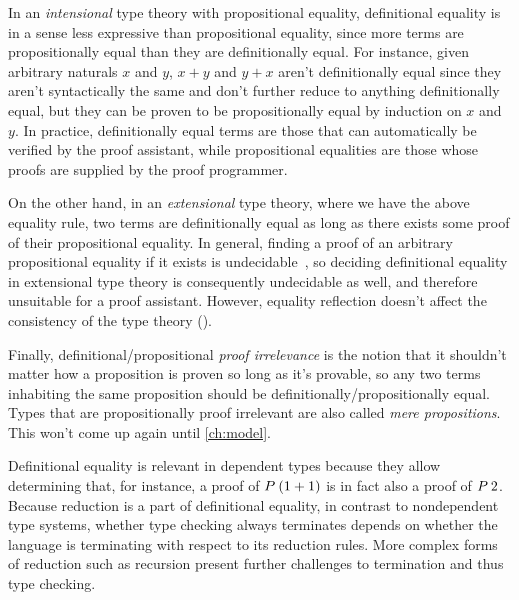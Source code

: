 In an \emph{intensional} type theory with propositional equality,
definitional equality is in a sense less expressive than propositional equality,
since more terms are propositionally equal than they are definitionally equal.
For instance, given arbitrary naturals $x$ and $y$,
$x + y$ and $y + x$ aren't definitionally equal since they aren't syntactically the same
and don't further reduce to anything definitionally equal,
but they can be proven to be propositionally equal by induction on $x$ and $y$.
In practice, definitionally equal terms are those that can automatically be verified by the proof assistant,
while propositional equalities are those whose proofs are supplied by the proof programmer.
%
%
On the other hand, in an \emph{extensional} type theory, where we have the above equality  rule,
two terms are definitionally equal as long as there exists some proof of their propositional equality.
In general, finding a proof of an arbitrary propositional equality if it exists is undecidable~\citep{extensional-concepts},
so deciding definitional equality in extensional type theory is consequently undecidable as well,
and therefore unsuitable for a proof assistant.
However, equality reflection doesn't affect the consistency of the type theory (\cf \opcit).

Finally, definitional/propositional \emph{proof irrelevance}
is the notion that it shouldn't matter how a proposition is proven so long as it's provable,
so any two terms inhabiting the same proposition should be definitionally/propositionally equal.
Types that are propositionally proof irrelevant are also called \emph{mere propositions}.
This won't come up again until \cref{ch:model}.

Definitional equality is relevant in dependent types because they allow determining that,
for instance, a proof of \mbox{$\app{P}{(1 + 1)}$}
is in fact also a proof of $\app{P}{2}$.
Because reduction is a part of definitional equality,
in contrast to nondependent type systems,
whether type checking always terminates depends on whether
the language is terminating with respect to its reduction rules.
More complex forms of reduction such as recursion present further challenges
to termination and thus type checking.


